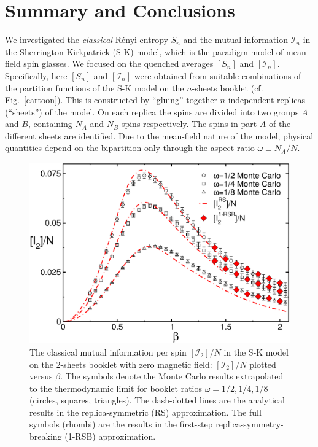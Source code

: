 \documentclass[twocolumn,superscriptaddress,prb,10pt]{revtex4-1}
\begin{document}
\section{Summary and Conclusions}
\label{conclusions}

We investigated the \emph{classical} R\'enyi entropy $S_n$ and the mutual information 
${\mathcal I}_n$ in the Sherrington-Kirkpatrick (S-K) model, which is the paradigm model 
of mean-field spin glasses. We focused on the quenched averages $[S_n]$ and $[{\mathcal I}_n]$. 
Specifically, here $[S_n]$ and $[{\mathcal I}_n]$ were obtained from suitable combinations 
of the partition functions of the S-K model on the $n$-sheets booklet (cf. Fig.~\ref{cartoon}). 
This is constructed by ``gluing'' together $n$ independent replicas (``sheets'') of the model. 
On each replica the spins are divided into two groups $A$ and $B$, containing $N_A$ and $N_B$ 
spins respectively. The spins in part $A$ of the different sheets are identified. Due to the 
mean-field nature of the model, physical quantities depend on the bipartition only through the 
aspect ratio $\omega\equiv N_A/N$. 

\begin{figure}[t]
\includegraphics*[width=0.93\linewidth]{./draft_figs/I2_extrapolated}
\caption{The classical mutual information per spin $[{\mathcal I}_2]/N$ 
 in the S-K model on the $2$-sheets booklet with zero magnetic field: 
 $[{\mathcal I}_2]/N$ plotted versus $\beta$. The symbols denote the 
 Monte Carlo results extrapolated to the thermodynamic limit for 
 booklet ratios $\omega=1/2,1/4,1/8$ (circles, squares, triangles). 
 The dash-dotted lines are the analytical results in the 
 replica-symmetric (RS) approximation. The full symbols (rhombi) 
 are the results in the first-step replica-symmetry-breaking (1-RSB) 
 approximation.
}
\label{I2-extrapolated}
\end{figure}
\end{document}
